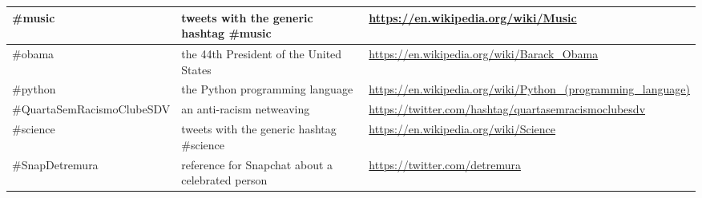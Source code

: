 \begin{apendicesenv}
\begin{table*}[h!]
\begin{center}
\begin{tabular}{| l || p{4cm} | p{4cm} | }
																																							      \#music & tweets with the generic hashtag \#music & \url{https://en.wikipedia.org/wiki/Music} \\\hline
																																								  \#obama & the 44th President of the United States & \url{https://en.wikipedia.org/wiki/Barack_Obama} \\\hline
																																								      \#python & the Python programming language & \url{https://en.wikipedia.org/wiki/Python_(programming_language)} \\\hline
																																									  \#QuartaSemRacismoClubeSDV & an anti-racism netweaving & \url{https://twitter.com/hashtag/quartasemracismoclubesdv} \\\hline
																																									      \#science & tweets with the generic hashtag \#science & \url{https://en.wikipedia.org/wiki/Science} \\\hline
																																										  \#SnapDetremura & reference for Snapchat about a celebrated person & \url{https://twitter.com/detremura} \\\hline
																																      \end{tabular}\end{center}
																															      \end{table*}                    



\end{apendicesenv}

